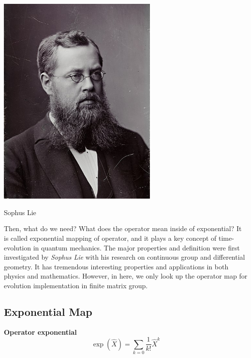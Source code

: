 
\begin{marginfigure}
    \centering
    \includegraphics[width=0.6\textwidth]{media/picture_Sophus_Lie.jpg}
    \caption{Sophus Lie}
    \label{fig:sopus_lie_picture}
\end{marginfigure}

Then, what do we need? What does the operator mean inside of exponential?
It is called exponential mapping of operator, and 
it plays a key concept of time-evolution in quantum mechanics.
The major properties and definition were first investigated by \textit{Sophus Lie} with his research on continuous group and 
differential geometry.
It has tremendous interesting properties and applications in both physics and mathematics.
However, in here, we only look up 
the operator map for evolution implementation in finite matrix group.

\subsection{Exponential Map}

\begin{definition}{\textbf{Operator exponential}}
    \begin{equation}
        \exp(\hat{X}) = \sum_{k=0} \frac{1}{k !} \hat{X}^k
    \end{equation}
\end{definition}

